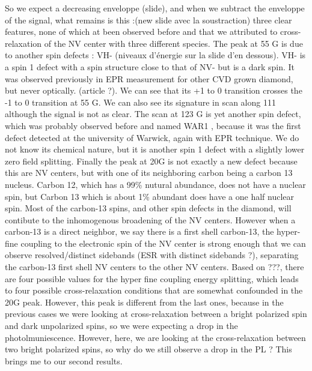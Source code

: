 \documentclass[a4paper]{article}
\begin{document}
So we expect a decreasing enveloppe (slide), and when we subtract the enveloppe of the signal, what remains is this :(new slide avec la soustraction) three clear features, none of which at been observed before and that we attributed to cross-relaxation of the NV center with three different species. 
The peak at 55 G is due to another spin defects : VH- (niveaux d'énergie sur la slide d'en dessous). VH- is a spin 1 defect with a spin structure close to that of NV- but is a dark spin. It was observed previously in EPR measurement for other CVD grown diamond, but never optically. (article ?). We can see that its +1 to 0 transition crosses the -1 to 0 transition at 55 G. We can also see its signature in scan along 111 although the signal is not as clear.
The scan at 123 G is yet another spin defect, which was probably observed before and named WAR1 , because it was the first defect detected at the university of Warwick, again with EPR technique. We do not know its chemical nature, but it is another spin 1 defect with a slightly lower zero field splitting.
Finally the peak at 20G is not exactly a new defect because this are NV centers, but with one of its neighboring carbon being a carbon 13 nucleus. Carbon 12, which has a 99\% nutural abundance, does not have a nuclear spin, but Carbon 13 which is about 1\% abundant does have a one half nuclear spin. Most of the carbon-13 spins, and other spin defects in the diamond, will contibute to the inhomogenous broadening of the NV centers. However when a carbon-13 is a direct neighbor, we say there is a first shell carbon-13, the hyper-fine coupling to the electronic spin of the NV center is strong enough that we can observe resolved/distinct sidebands (ESR with distinct sidebands ?), separating the carbon-13 first shell NV centers to the other NV centers. Based on ???, there are four possible values for the hyper fine coupling energy splitting, which leads to four possible cross-relaxation conditions that are somewhat confounded in the 20G peak.
However, this peak is different from the last ones, because in the previous cases we were looking at cross-relaxation between a bright polarized spin and dark unpolarized spins, so we were expecting a drop in the photolmuniescence. However, here, we are looking at the cross-relaxation between two bright polarized spins, so why do we still observe a drop in the PL ? This brings me to our second results.
\end{document}
